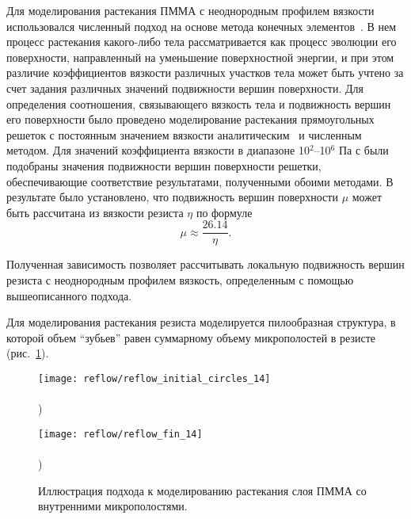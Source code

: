 Для моделирования растекания ПММА с неоднородным профилем вязкости использовался численный подход на основе метода конечных элементов~\cite{Brakke_SE}. В нем процесс растекания какого-либо тела рассматривается как процесс эволюции его поверхности, направленный на уменьшение поверхностной энергии, и при этом различие коэффициентов вязкости различных участков тела может быть учтено за счет задания различных значений подвижности вершин поверхности. Для определения соотношения, связывающего вязкость тела и подвижность вершин его поверхности было проведено моделирование растекания прямоугольных решеток с постоянным значением вязкости аналитическим~\cite{Leveder_2010} и численным методом. Для значений коэффициента вязкости в диапазоне 10$^2$--10$^6$ Па с были подобраны значения подвижности вершин поверхности решетки, обеспечивающие соответствие результатами, полученными обоими методами. В результате было установлено, что подвижность вершин поверхности $\mu$ может быть рассчитана из вязкости резиста $\eta$ по формуле
\begin{equation}
	\mu \approx \frac{26.14}{\eta}.
\end{equation}

Полученная зависимость позволяет рассчитывать локальную подвижность вершин резиста с неоднородным профилем вязкость, определенным с помощью вышеописанного подхода.

Для моделирования растекания резиста моделируется пилообразная структура, в которой объем ``зубьев'' равен суммарному объему микрополостей в резисте (рис.~\ref{fig:reflow_surface}).

\begin{figure}[h]
	\begin{minipage}{0.48\textwidth}
		\texttt{[image: reflow/reflow\_initial\_circles\_14]} \\
		\vspace{-28.5ex} \\ ) \\ \vspace{28.5ex}
	\end{minipage}
	\begin{minipage}{0.48\textwidth}
		\texttt{[image: reflow/reflow\_fin\_14]} \\
		\vspace{-28.5ex} \\ ) \\ \vspace{28.5ex}
	\end{minipage}
	\vspace{-3.5em}
	\caption{Иллюстрация подхода к моделированию растекания слоя ПММА со внутренними микрополостями.}
	\label{fig:reflow_surface}
\end{figure}

